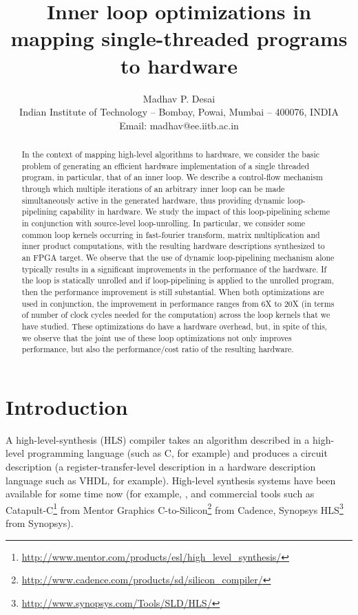 \documentclass[conference]{IEEEtran}
\title{Inner loop optimizations in mapping single-threaded programs to hardware}
\author{Madhav P. Desai\\
  Indian Institute of Technology -- Bombay, Powai, Mumbai -- 400076, INDIA\\
  Email: madhav@ee.iitb.ac.in }
\begin{document}
\maketitle
\thispagestyle{empty}

\begin{abstract}

  In the context of mapping high-level algorithms to hardware,
  we consider the basic problem of generating an efficient hardware 
  implementation of a single threaded program, in particular, that
  of an inner loop.  
  We describe a control-flow mechanism through
  which multiple iterations of an arbitrary inner loop can be made simultaneously
  active in the generated hardware, thus providing dynamic loop-pipelining
  capability in hardware.   
  We study the impact of this loop-pipelining scheme in conjunction with
  source-level loop-unrolling.
  In particular, we consider some common loop kernels occurring in fast-fourier transform,
  matrix multiplication and inner product computations, with the resulting
  hardware descriptions synthesized to an FPGA target.  We observe
  that the use of dynamic loop-pipelining mechanism alone typically results in
  a significant improvements in the performance of the hardware.  If the loop is
  statically unrolled and if loop-pipelining is applied to the unrolled
  program, then the performance improvement is still substantial.  When
  both optimizations are used in conjunction, the improvement in performance
  ranges from 6X to 20X (in terms of number of clock cycles needed for the computation)
  across the loop kernels that we have studied.
  These optimizations do have a hardware overhead, but,
  in spite of this, we observe that the joint use of these 
  loop optimizations not only improves performance, but also the 
  performance/cost ratio of the resulting hardware.
 

\end{abstract}

\section{Introduction}

A high-level-synthesis (HLS) compiler takes an algorithm described in
a high-level programming language (such as C, for example) and produces a circuit
description (a register-transfer-level description in a hardware
description language such as VHDL, for example).
High-level synthesis systems have been available for some time
now (for example, \cite{pegasus-cash}, \cite{spark-vlsi-paper} and
commercial tools such as Catapult-C\footnote{\url{http://www.mentor.com/products/esl/high_level_synthesis/}} from Mentor Graphics
C-to-Silicon\footnote{\url{http://www.cadence.com/products/sd/silicon_compiler/}} from Cadence,
Synopsys HLS\footnote{\url{http://www.synopsys.com/Tools/SLD/HLS/}} from Synopsys).
\end{document}
